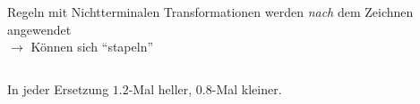 \documentclass{beamer}
\theoremstyle{example}
\begin{document}
\begin{frame}{Regeln mit Nichtterminalen}
Transformationen werden \emph{nach} dem Zeichnen angewendet\\
$\longrightarrow$ Können sich ``stapeln''
\begin{columns}
\column{6cm}

\column{4cm}
\begin{center}
\end{center}
\end{columns}\medskip
In jeder Ersetzung $1.2$-Mal heller, $0.8$-Mal kleiner.
\end{frame}
\end{document}
